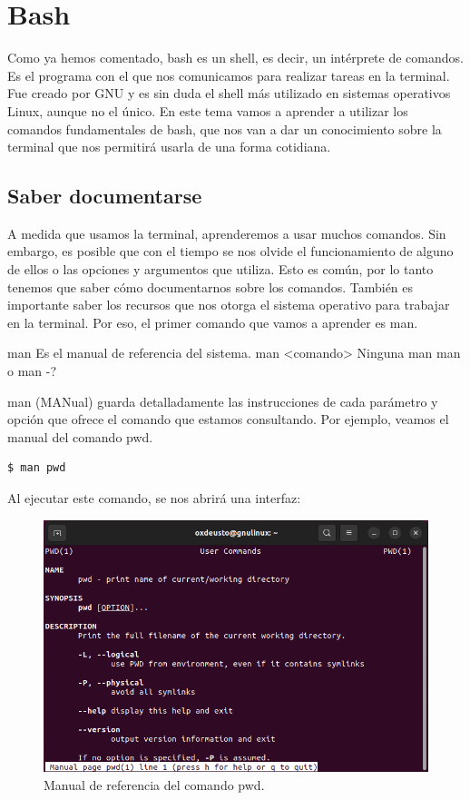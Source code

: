 \chapter{Bash}

Como ya hemos comentado, bash es un shell, es decir, un intérprete de comandos. Es el programa con el que nos comunicamos para realizar tareas en la terminal. Fue creado por GNU y es sin duda el shell más utilizado en sistemas operativos Linux, aunque no el único. En este tema vamos a aprender a utilizar los comandos fundamentales de bash, que nos van a dar un conocimiento sobre la terminal que nos permitirá usarla de una forma cotidiana.

\section{Saber documentarse}
A medida que usamos la terminal, aprenderemos a usar muchos comandos. Sin embargo, es posible que con el tiempo se nos olvide el funcionamiento de alguno de ellos o las opciones y argumentos que utiliza. Esto es común, por lo tanto tenemos que saber cómo documentarnos sobre los comandos. También es importante saber los recursos que nos otorga el sistema operativo para trabajar en la terminal. Por eso, el primer comando que vamos a aprender es man.

\begin{command-info}
{man}
{Es el manual de referencia del sistema.}
{man <comando>}
{Ninguna}
{man man o man -?}
\end{command-info}

man (MANual) guarda detalladamente las instrucciones de cada parámetro y opción que ofrece el comando que estamos consultando. Por ejemplo, veamos el manual del comando pwd.

\begin{tcolorbox-code}
\begin{lstlisting}
$ man pwd
\end{lstlisting}
\end{tcolorbox-code}

Al ejecutar este comando, se nos abrirá una interfaz:
\begin{figure}[H]
    \centering
    \includegraphics[width=0.80\linewidth]{resources/images/man.png}
    \caption{Manual de referencia del comando pwd.}
\end{figure}

